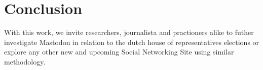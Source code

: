 \section{Conclusion}

With this work, we invite researchers, journalista and practioners alike to futher investigate Mastodon in relation to the dutch house of representatives elections or explore any other new and upcoming Social Networking Site using similar methodology.